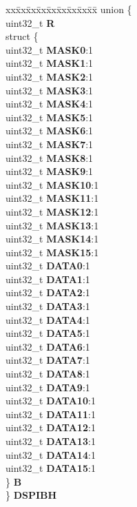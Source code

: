 \begin{DoxyCompactItemize}
\begin{tabbing}
\end{tabbing}\item 
\mbox{\label{structSIU__tag_a04ee5a3aeb9afe855fdca29c270959e9}} 
\begin{tabbing}
xx\=xx\=xx\=xx\=xx\=xx\=xx\=xx\=xx\=\kill
union \{\\
\>uint32\_t {\bfseries R}\\
\>struct \{\\
\>\>uint32\_t {\bfseries MASK0}:1\\
\>\>uint32\_t {\bfseries MASK1}:1\\
\>\>uint32\_t {\bfseries MASK2}:1\\
\>\>uint32\_t {\bfseries MASK3}:1\\
\>\>uint32\_t {\bfseries MASK4}:1\\
\>\>uint32\_t {\bfseries MASK5}:1\\
\>\>uint32\_t {\bfseries MASK6}:1\\
\>\>uint32\_t {\bfseries MASK7}:1\\
\>\>uint32\_t {\bfseries MASK8}:1\\
\>\>uint32\_t {\bfseries MASK9}:1\\
\>\>uint32\_t {\bfseries MASK10}:1\\
\>\>uint32\_t {\bfseries MASK11}:1\\
\>\>uint32\_t {\bfseries MASK12}:1\\
\>\>uint32\_t {\bfseries MASK13}:1\\
\>\>uint32\_t {\bfseries MASK14}:1\\
\>\>uint32\_t {\bfseries MASK15}:1\\
\>\>uint32\_t {\bfseries DATA0}:1\\
\>\>uint32\_t {\bfseries DATA1}:1\\
\>\>uint32\_t {\bfseries DATA2}:1\\
\>\>uint32\_t {\bfseries DATA3}:1\\
\>\>uint32\_t {\bfseries DATA4}:1\\
\>\>uint32\_t {\bfseries DATA5}:1\\
\>\>uint32\_t {\bfseries DATA6}:1\\
\>\>uint32\_t {\bfseries DATA7}:1\\
\>\>uint32\_t {\bfseries DATA8}:1\\
\>\>uint32\_t {\bfseries DATA9}:1\\
\>\>uint32\_t {\bfseries DATA10}:1\\
\>\>uint32\_t {\bfseries DATA11}:1\\
\>\>uint32\_t {\bfseries DATA12}:1\\
\>\>uint32\_t {\bfseries DATA13}:1\\
\>\>uint32\_t {\bfseries DATA14}:1\\
\>\>uint32\_t {\bfseries DATA15}:1\\
\>\} {\bfseries B}\\
\} {\bfseries DSPIBH}\\


\end{tabbing}
\end{DoxyCompactItemize}
